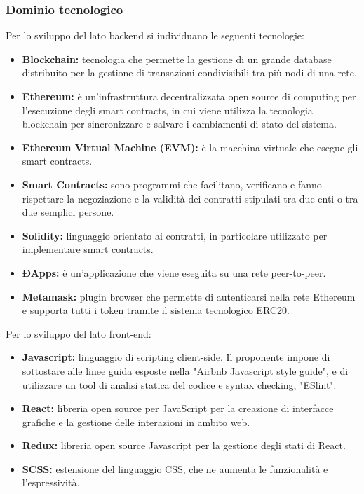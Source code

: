 \subsubsection{Dominio tecnologico}
Per lo sviluppo del lato backend si individuano le seguenti tecnologie:
\begin{itemize}
    \item \textbf{Blockchain:} tecnologia che permette la gestione di un grande 
database distribuito per la gestione di transazioni condivisibili tra più nodi 
di una rete.
	\item \textbf{Ethereum:} è un'infrastruttura decentralizzata open source di 
computing per l'esecuzione degli smart contracts, in cui viene utilizza la 
tecnologia blockchain per sincronizzare e salvare i cambiamenti di stato del 
sistema.
	\item \textbf{Ethereum Virtual Machine (EVM): }è la macchina virtuale che 
esegue gli smart contracts.
	\item \textbf{Smart Contracts:} sono programmi che facilitano, verificano e 
fanno rispettare la negoziazione e la validità dei contratti stipulati tra due 
enti o tra due semplici persone.
	\item \textbf{Solidity:} linguaggio orientato ai contratti, in particolare 
utilizzato per implementare smart contracts.
	\item \textbf{ÐApps:} è un'applicazione che viene eseguita su una rete 
peer-to-peer.
	\item \textbf{Metamask:} plugin browser che permette di autenticarsi nella rete Ethereum e supporta tutti i token tramite il sistema tecnologico ERC20.

\end{itemize}
Per lo sviluppo del lato front-end:
\begin{itemize}
	\item \textbf{Javascript:} linguaggio di scripting client-side. Il proponente 
impone di sottostare alle linee guida esposte nella "Airbnb Javascript style 
guide", e di utilizzare un tool di analisi statica del codice e syntax checking, "ESlint"\glo.
	\item \textbf{React:}  libreria open source per JavaScript per la creazione di interfacce grafiche e la gestione delle interazioni in ambito web.
	\item \textbf {Redux:} libreria open source Javascript per la gestione degli stati di React.	
	\item \textbf{SCSS:} estensione del linguaggio CSS, che ne aumenta le 
funzionalità e l'espressività.
\end{itemize}

